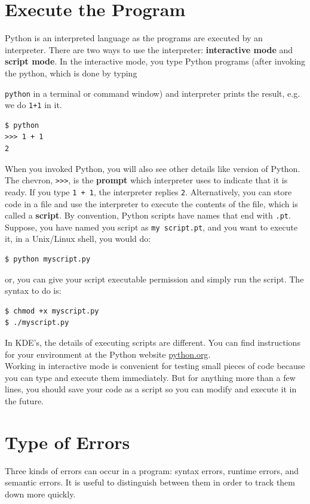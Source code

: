 \documentclass[10pt]{book}
\begin{document}
\section{Execute the Program}
Python is an interpreted language as the programs are executed by an interpreter. 
There are two ways to use the interpreter: 
{\bf interactive mode} and {\bf script mode}. 
In the interactive mode, you type Python programs (after invoking the python, 
which is done by typing {\verb"python" in a terminal or command window) and 
interpreter prints the result, e.g. we do \verb"1+1" in it.

\beforeverb
\begin{verbatim}
$ python
>>> 1 + 1
2
\end{verbatim}
\afterverb
When you invoked Python, you will also see other details like version of Python. \\ 

The chevron, \verb">>>", is the {\bf prompt} which interpreter uses to indicate 
that it is ready. If you type {\tt 1 + 1}, the interpreter replies {\tt 2}. 
Alternatively, you can store code in a file and use the interpreter to execute 
the contents of the file, which is called a {\bf script}.  By convention, Python 
scripts have names that end with {\tt .pt}. Suppose, you have named you script as 
{\tt my script.pt}, and you want to execute it, in a Unix/Linux shell, you would do:
\beforeverb
\begin{verbatim}
$ python myscript.py
\end{verbatim}
\afterverb
or, you can give your script executable permission and simply run the script. 
The syntax to do is:
\beforeverb
\begin{verbatim}
$ chmod +x myscript.py
$ ./myscript.py
\end{verbatim}
\afterverb

In KDE's, the details of executing scripts are different.  
You can find instructions for your environment at the Python website \url{python.org}. \\


Working in interactive mode is convenient for testing small pieces of code because 
you can type and execute them immediately.  But for anything more than a few lines, 
you should save your code as a script so you can modify and execute it in the future. \\


\section{Type of Errors}
Three kinds of errors can occur in a program: syntax errors, runtime  errors, and 
semantic errors. It is useful to distinguish between them in order to track them down 
more quickly. \\

}
\end{document}
